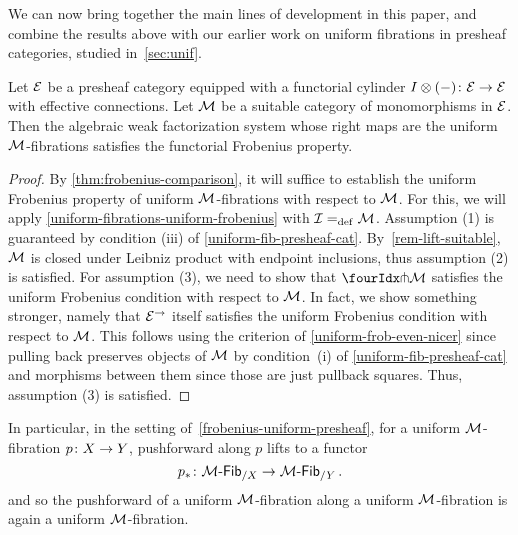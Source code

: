\documentclass[reqno,10pt,a4paper,oneside,draft]{amsart}
\begin{document}
We can now bring together the main lines of development in this paper, and combine the results above with our earlier work on uniform fibrations in presheaf categories, studied in~\cref{sec:unif}.

\begin{theorem} \label{frobenius-uniform-presheaf}
Let $\catE$ be a presheaf category equipped with a functorial cylinder $I \otimes (-) \co \catE \to \catE$ with effective connections.
Let $\cal{M}$ be a suitable category of monomorphisms in $\catE$.
Then the algebraic weak factorization system whose right maps are the uniform $\cal{M}$-fibrations satisfies the functorial Frobenius property.
\end{theorem}

\begin{proof}
By \cref{thm:frobenius-comparison}, it will suffice to establish the uniform Frobenius property of uniform $\cal{M}$-fibrations with respect to $\cal{M}$.
For this, we will apply \cref{uniform-fibrations-uniform-frobenius} with $\cal{I} \defeq \cal{M}$.
Assumption (1) is guaranteed by condition (iii) of \cref{uniform-fib-presheaf-cat}.
By~\cref{rem-lift-suitable}, $\cal{M}$ is closed under Leibniz product with endpoint inclusions, thus assumption (2) is satisfied.
For assumption (3), we need to show that $\liftr{\cal{M}}$ satisfies the uniform Frobenius condition with respect to $\cal{M}$.
In fact, we show something stronger, namely that $\catE^\to$ itself satisfies the uniform Frobenius condition with respect to $\cal{M}$.
This follows using the criterion of \cref{uniform-frob-even-nicer} since pulling back preserves objects of $\cal{M}$ by condition~(i) of \cref{uniform-fib-presheaf-cat} and morphisms between them since those are just pullback squares.
Thus, assumption (3) is satisfied.
\end{proof}

In particular, in the setting of~\cref{frobenius-uniform-presheaf}, for a uniform $\cal{M}$-fibration $p \co X \to Y$, pushforward along $p$ lifts to a functor
\[
p_* \co \Fib{\cal{M}}_{/X} \to \Fib{\cal{M}}_{/Y} \, .
\]
and so the pushforward of a uniform $\cal{M}$-fibration along a uniform $\cal{M}$-fibration is again a uniform $\cal{M}$-fibration.
\end{document}
